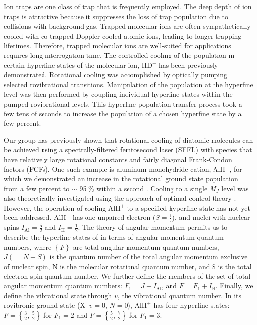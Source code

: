 \documentclass[twoside,twocolumn,9pt]{article}
\begin{document}
Ion traps are one class of trap that is frequently employed. The deep  depth of ion traps is attractive because it suppresses the loss of trap population due to collisions with background gas. Trapped molecular ions are often sympathetically cooled with co-trapped Doppler-cooled atomic ions, leading to longer trapping lifetimes. Therefore, trapped molecular ions are well-suited for applications requires long interrogation time. The controlled cooling of the population in certain hyperfine states of the molecular ion, HD$^+$ has been previously demonstrated\cite{bressel2012manipulation}. Rotational cooling was accomplished by optically pumping selected rovibrational transitions\cite{schneider2010all}. Manipulation of the population at the hyperfine level was then performed by coupling individual hyperfine states within the pumped rovibrational levels. This hyperfine population transfer process took a few tens of seconds to increase the population of a chosen hyperfine state by a few percent.\par
Our group has previously shown that rotational cooling of diatomic molecules can be achieved using a spectrally-filtered femtosecond laser (SFFL) with species that have relatively large rotational constants and fairly diagonal Frank-Condon factors (FCFs)\cite{lien2011optical}. One such example is aluminum monohydride cation, $\mathrm{AlH}^+$, for which we demonstrated an increase in the rotational ground state population from a few percent to $\sim$ 95 $\%$ within a second \cite{lien2014broadband}. Cooling to a single $M_{J}$ level was also theoretically investigated using the approach of optimal control theory \cite{aroch2018optimizing}. However, the operation of cooling $\mathrm{AlH}^+$ to a specified hyperfine state has not yet been addressed. $\mathrm{AlH}^+$ has one unpaired electron ($S=\frac{1}{2}$), and nuclei with nuclear spins $I_\mathrm{Al}=\frac{5}{2}$ and $I_\mathrm{H}=\frac{1}{2}$. The theory of angular momentum permits us to describe the hyperfine states of  in terms of  angular momentum quantum numbers, where $\left\lbrace F \right\rbrace$ are total angular momentum quantum numbers, $J\left(=N+S\right)$ is the quantum number of the total angular momentum exclusive of nuclear spin, N is the molecular rotational quantum number, and S is the total electron-spin quantum number. We further define the members of the set of total angular momentum quantum numbers: $F_{1}=J+I_\mathrm{Al}$, and $F=F_{1}+I_\mathrm{H}$. Finally, we define the vibrational state through $v$, the vibrational quantum number. In its rovibronic ground state ($\mathrm{X}$, $v=0$, $N=0$), $\mathrm{AlH}^+$ has four hyperfine states: $F=\left\lbrace\frac{3}{2},\, \frac{5}{2}\right\rbrace$ for $F_{1}=2$ and $F=\left\lbrace\frac{5}{2},\, \frac{7}{2}\right\rbrace$ for $F_{1}=3$.\par
\end{document}
